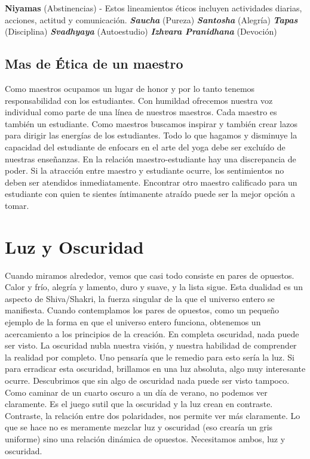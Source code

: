 \textbf{Niyamas} (Abstinencias) - Estos lineamientos \'eticos incluyen actividades diarias, acciones, actitud y comunicación.
\textbf{\textit{Saucha}} (Pureza)
\textbf{\textit{Santosha}} (Alegría)
\textbf{\textit{Tapas}} (Disciplina)
\textbf{\textit{Svadhyaya}} (Autoestudio)
\textbf{\textit{Izhvara Pranidhana}} (Devoción)

\subsection{Mas de Ética de un maestro}
Como maestros ocupamos un lugar de honor y por lo tanto tenemos responsabilidad con los estudiantes. Con humildad ofrecemos nuestra voz individual como parte de una línea de nuestros maestros. Cada maestro es tambi\'en un estudiante. Como maestros buscamos inspirar y tambi\'en crear lazos para dirigir las energías de los estudiantes. Todo lo que hagamos y disminuye la capacidad del estudiante de enfocars en el arte del yoga debe ser excluído de nuestras enseñanzas. En la relación maestro-estudiante hay una discrepancia de poder. Si la atracción entre maestro y estudiante ocurre, los sentimientos no deben ser atendidos inmediatamente. Encontrar otro maestro calificado para un estudiante con quien te sientes íntimanente atraído puede ser la mejor opción a tomar.

\section{Luz y Oscuridad}
Cuando miramos alrededor, vemos que casi todo consiste en pares de opuestos. Calor y frío, alegría y lamento, duro y suave, y la lista sigue. Esta dualidad es un aspecto de Shiva/Shakri, la fuerza singular de la que el universo entero se manifiesta. Cuando contemplamos los pares de opuestos, como un pequeño ejemplo de la forma en que el universo entero funciona, obtenemos un acercamiento a los principios de la creación. En completa oscuridad, nada puede ser visto. La oscuridad nubla nuestra visión, y nuestra habilidad de comprender la realidad por completo. Uno pensaría que le remedio para esto sería la luz. Si para erradicar esta oscuridad, brillamos en una luz absoluta, algo muy interesante ocurre. Descubrimos que sin algo de oscuridad nada puede ser visto tampoco. Como caminar de un cuarto oscuro a un día de verano, no podemos ver claramente. Es el juego sutil que la oscuridad y la luz crean en contraste. Contraste, la relación entre dos polaridades, nos permite ver más claramente. Lo que se hace no es meramente mezclar luz y oscuridad (eso crearía un gris uniforme) sino una relación dinámica de opuestos. Necesitamos ambos, luz y oscuridad.

